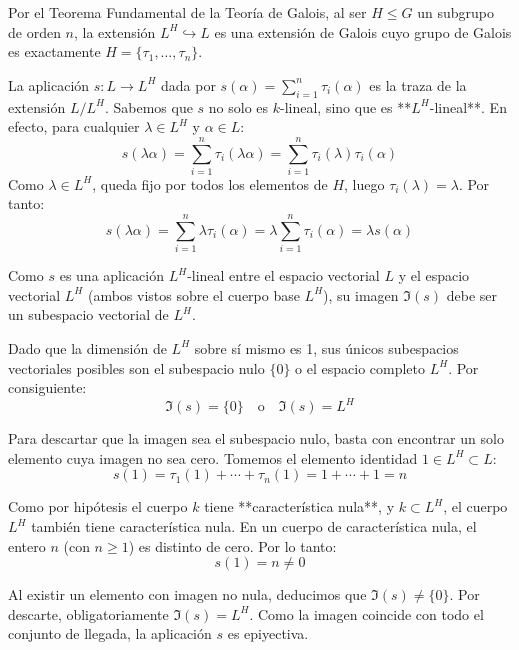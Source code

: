 \begin{enumerate}
\begin{dem}

    Por el Teorema Fundamental de la Teoría de Galois, al ser $H \le G$ un subgrupo de orden $n$, la extensión $L^H \hookrightarrow L$ es una extensión de Galois cuyo grupo de Galois es exactamente $H = \{\tau_1, \dots, \tau_n\}$.

    La aplicación $s : L \rightarrow L^H$ dada por $s(\alpha) = \sum_{i=1}^n \tau_i(\alpha)$ es la traza de la extensión $L/L^H$. Sabemos que $s$ no solo es $k$-lineal, sino que es **$L^H$-lineal**. En efecto, para cualquier $\lambda \in L^H$ y $\alpha \in L$:
    $$s(\lambda \alpha) = \sum_{i=1}^n \tau_i(\lambda \alpha) = \sum_{i=1}^n \tau_i(\lambda)\tau_i(\alpha)$$
    Como $\lambda \in L^H$, queda fijo por todos los elementos de $H$, luego $\tau_i(\lambda) = \lambda$. Por tanto:
    $$s(\lambda \alpha) = \sum_{i=1}^n \lambda \tau_i(\alpha) = \lambda \sum_{i=1}^n \tau_i(\alpha) = \lambda s(\alpha)$$

    Como $s$ es una aplicación $L^H$-lineal entre el espacio vectorial $L$ y el espacio vectorial $L^H$ (ambos vistos sobre el cuerpo base $L^H$), su imagen $\Im(s)$ debe ser un subespacio vectorial de $L^H$.
    
    Dado que la dimensión de $L^H$ sobre sí mismo es 1, sus únicos subespacios vectoriales posibles son el subespacio nulo $\{0\}$ o el espacio completo $L^H$. Por consiguiente:
    $$\Im(s) = \{0\} \quad \text{o} \quad \Im(s) = L^H$$

    Para descartar que la imagen sea el subespacio nulo, basta con encontrar un solo elemento cuya imagen no sea cero. Tomemos el elemento identidad $1 \in L^H \subset L$:
    $$s(1) = \tau_1(1) + \cdots + \tau_n(1) = 1 + \cdots + 1 = n$$
    
    Como por hipótesis el cuerpo $k$ tiene **característica nula**, y $k \subset L^H$, el cuerpo $L^H$ también tiene característica nula. En un cuerpo de característica nula, el entero $n$ (con $n \ge 1$) es distinto de cero. 
    Por lo tanto:
    $$s(1) = n \neq 0$$

    Al existir un elemento con imagen no nula, deducimos que $\Im(s) \neq \{0\}$. Por descarte, obligatoriamente $\Im(s) = L^H$. Como la imagen coincide con todo el conjunto de llegada, la aplicación $s$ es epiyectiva.
    \end{dem}
    

\end{enumerate}

